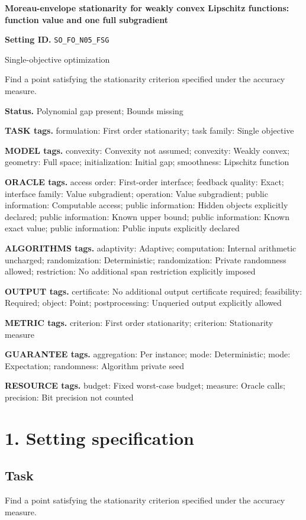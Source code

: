 \documentclass[10pt,a4paper]{article}
\begin{document}
\raggedright

{\LARGE\bfseries\sffamily\color{AtlasNavy} Moreau-envelope stationarity for weakly convex Lipschitz functions: function value and one full subgradient\par}\vspace{5pt}
\textbf{Setting ID.} \texttt{SO\_\allowbreak{}FO\_\allowbreak{}N05\_\allowbreak{}FSG}

Single-objective optimization

Find a point satisfying the stationarity criterion specified under the accuracy measure.

\textbf{Status.} Polynomial gap present; Bounds missing

\textbf{TASK tags.} formulation: First order stationarity; task family: Single objective

\textbf{MODEL tags.} convexity: Convexity not assumed; convexity: Weakly convex; geometry: Full space; initialization: Initial gap; smoothness: Lipschitz function

\textbf{ORACLE tags.} access order: First-order interface; feedback quality: Exact; interface family: Value subgradient; operation: Value subgradient; public information: Computable access; public information: Hidden objects explicitly declared; public information: Known upper bound; public information: Known exact value; public information: Public inputs explicitly declared

\textbf{ALGORITHMS tags.} adaptivity: Adaptive; computation: Internal arithmetic uncharged; randomization: Deterministic; randomization: Private randomness allowed; restriction: No additional span restriction explicitly imposed

\textbf{OUTPUT tags.} certificate: No additional output certificate required; feasibility: Required; object: Point; postprocessing: Unqueried output explicitly allowed

\textbf{METRIC tags.} criterion: First order stationarity; criterion: Stationarity measure

\textbf{GUARANTEE tags.} aggregation: Per instance; mode: Deterministic; mode: Expectation; randomness: Algorithm private seed

\textbf{RESOURCE tags.} budget: Fixed worst-case budget; measure: Oracle calls; precision: Bit precision not counted

\section{1. Setting specification}
\subsection{Task}
Find a point satisfying the stationarity criterion specified under the accuracy measure.
\end{document}
